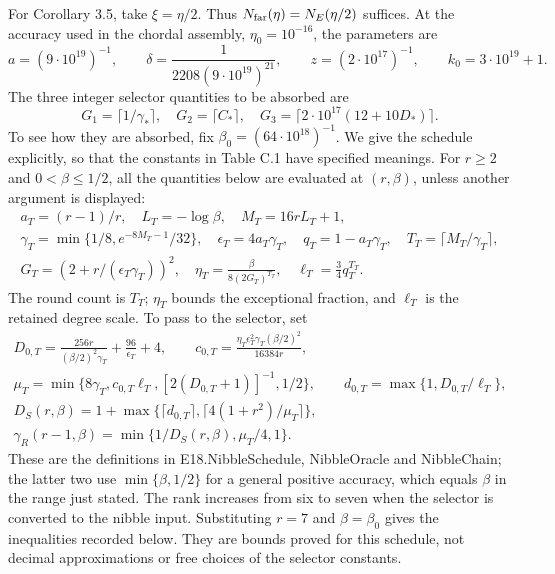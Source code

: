 \documentclass[english,11pt,a4paper]{article}
\begin{document}
For Corollary 3.5, take \(\xi=\eta/2\). Thus \(N_{\rm far}(\eta)=N_E(\eta/2)\) suffices. At the accuracy used in the chordal assembly, \(\eta_0=10^{-16}\), the parameters are \[
a=(9\cdot10^{19})^{-1},\qquad
\delta=\frac1{2208(9\cdot10^{19})^{21}},\qquad
z=(2\cdot10^{17})^{-1},\qquad k_0=3\cdot10^{19}+1.
\] The three integer selector quantities to be absorbed are \[
G_1=\lceil1/\gamma_*\rceil,\quad G_2=\lceil C_*\rceil,\quad
G_3=\lceil2\cdot10^{17}(12+10D_*)\rceil.
\] To see how they are absorbed, fix \(\beta_0=(64\cdot10^{18})^{-1}\). We give the schedule explicitly, so that the constants in Table C.1 have specified meanings. For \(r\ge2\) and \(0<\beta\le1/2\), all the quantities below are evaluated at \((r,\beta)\), unless another argument is displayed: \[
\begin{gathered}
a_T=(r-1)/r,\quad L_T=-\log\beta,\quad M_T=16rL_T+1,\\
\gamma_T=\min\{1/8,e^{-8M_T-1}/32\},\quad
\epsilon_T=4a_T\gamma_T,\quad q_T=1-a_T\gamma_T,\quad
T_T=\lceil M_T/\gamma_T\rceil,\\
G_T=(2+r/(\epsilon_T\gamma_T))^2,\quad
\eta_T=\frac{\beta}{8(2G_T)^{T_T}},\quad
\ell_T=\frac34q_T^{T_T}.
\end{gathered}
\] The round count is \(T_T\); \(\eta_T\) bounds the exceptional fraction, and \(\ell_T\) is the retained degree scale. To pass to the selector, set \[
\begin{gathered}
D_{0,T}=\frac{256r}{(\beta/2)^2\gamma_T}+\frac{96}{\epsilon_T}+4,\qquad
c_{0,T}=\frac{\eta_T\epsilon_T^2\gamma_T(\beta/2)^2}{16384r},\\
\mu_T=\min\{8\gamma_T,c_{0,T}\ell_T,[2(D_{0,T}+1)]^{-1},1/2\},\qquad
d_{0,T}=\max\{1,D_{0,T}/\ell_T\},\\
D_S(r,\beta)=1+\max\{\lceil d_{0,T}\rceil,\lceil4(1+r^2)/\mu_T\rceil\},\\
\gamma_R(r-1,\beta)=\min\{1/D_S(r,\beta),\mu_T/4,1\}.
\end{gathered}
\] These are the definitions in {\ttfamily\small E18.\discretionary{\hbox{\ensuremath{\hookrightarrow}}}{}{}NibbleSchedu\discretionary{\hbox{\ensuremath{\hookrightarrow}}}{}{}le}, {\ttfamily\small NibbleOracle} and {\ttfamily\small NibbleChain}; the latter two use \(\min\{\beta,1/2\}\) for a general positive accuracy, which equals \(\beta\) in the range just stated. The rank increases from six to seven when the selector is converted to the nibble input. Substituting \(r=7\) and \(\beta=\beta_0\) gives the inequalities recorded below. They are bounds proved for this schedule, not decimal approximations or free choices of the selector constants.
\end{document}
